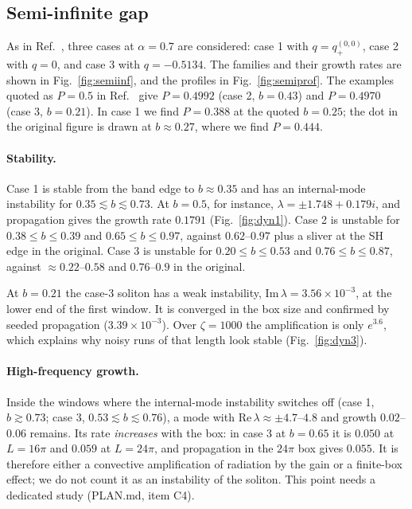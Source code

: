\documentclass[pra,twocolumn,superscriptaddress,longbibliography]{revtex4-2}
\newcommand{\Img}{\mathrm{Im}\,}
\newcommand{\Rea}{\mathrm{Re}\,}
\begin{document}
\subsection{Semi-infinite gap}\label{sec:semiinf}
As in Ref.~\cite{MKM2013}, three cases at $\alpha=0.7$ are considered: case 1 with
$q=q_+^{(0,0)}$, case 2 with $q=0$, and case 3 with $q=-0.5134$. The families and their growth
rates are shown in Fig.~\ref{fig:semiinf}, and the profiles in Fig.~\ref{fig:semiprof}. The
examples quoted as $P=0.5$ in Ref.~\cite{MKM2013} give $P=0.4992$ (case 2, $b=0.43$) and $P=0.4970$
(case 3, $b=0.21$). In case 1 we find $P=0.388$ at the quoted $b=0.25$; the dot in the original
figure is drawn at $b\approx0.27$, where we find $P=0.444$.

\paragraph*{Stability.}
Case 1 is stable from the band edge to $b\approx0.35$ and has an internal-mode instability for
$0.35\lesssim b\lesssim0.73$. At $b=0.5$, for instance, $\lambda = \pm1.748 + 0.179i$, and
propagation gives the growth rate $0.1791$ (Fig.~\ref{fig:dyn1}). Case 2 is unstable for
$0.38\le b\le0.39$ and $0.65\le b\le0.97$, against $0.62$--$0.97$ plus a sliver at the SH edge in
the original. Case 3 is unstable for $0.20\le b\le0.53$ and $0.76\le b\le0.87$, against
$\approx0.22$--$0.58$ and $0.76$--$0.9$ in the original.

At $b=0.21$ the case-3 soliton has a weak instability, $\Img\lambda = 3.56\times10^{-3}$, at the
lower end of the first window. It is converged in the box size and confirmed by seeded propagation
($3.39\times10^{-3}$). Over $\zeta=1000$ the amplification is only $e^{3.6}$, which explains why
noisy runs of that length look stable (Fig.~\ref{fig:dyn3}).

\paragraph*{High-frequency growth.}
Inside the windows where the internal-mode instability switches off (case 1, $b\gtrsim0.73$;
case 3, $0.53\lesssim b\lesssim0.76$), a mode with $\Rea\lambda\approx\pm4.7$--$4.8$ and growth
$0.02$--$0.06$ remains. Its rate \emph{increases} with the box: in case 3 at $b=0.65$ it is
$0.050$ at $L=16\pi$ and $0.059$ at $L=24\pi$, and propagation in the $24\pi$ box gives $0.055$.
It is therefore either a convective amplification of radiation by the gain or a finite-box
effect; we do not count it as an instability of the soliton. This point needs a dedicated study
(PLAN.md, item C4).
\end{document}
